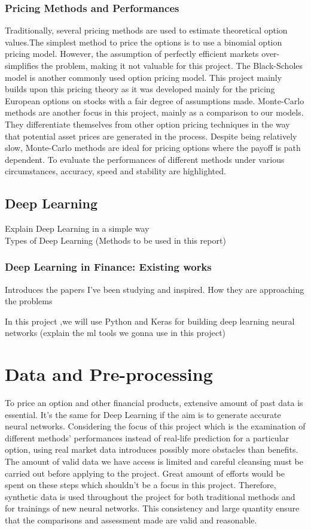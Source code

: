 \documentclass{report}
\begin{document}
\subsection{Pricing Methods and Performances}
Traditionally, several pricing methods are used to estimate theoretical option values.The simplest method to price the options is to use a binomial option pricing model. However,  the assumption of perfectly efficient markets over-simplifies the problem, making it not valuable for this project. The Black-Scholes model is another commonly used option pricing model. This project mainly builds upon this pricing theory as it was developed mainly for the pricing European options on stocks with a fair degree of assumptions made. Monte-Carlo methods are another focus in this project, mainly as a comparison to our models. They differentiate themselves from other option pricing techniques in the way that potential asset prices are generated in the process. Despite being relatively slow, Monte-Carlo methods are ideal for pricing options where the payoff is path dependent. To evaluate the performances of different methods under various circumstances, accuracy, speed and stability are highlighted. 

\section{Deep Learning}
Explain Deep Learning in a simple way\\
Types of Deep Learning (Methods to be used in this report)

\subsection{Deep Learning in Finance: Existing works}
Introduces the papers I've been studying and inspired. How they are approaching the problems

In this project ,we will use Python and Keras for building deep learning neural networks (explain the ml tools we gonna use in this project)

\chapter{Data and Pre-processing}
To price an option and other financial products, extensive amount of past data is essential. It's the same for Deep Learning if the aim is to generate accurate neural networks. Considering the focus of this project which is the examination of different methods' performances instead of real-life prediction for a particular option, using real market data introduces possibly more obstacles than benefits. The amount of valid data we have access is limited and careful cleansing must be carried out before applying to the project. Great amount of efforts would be spent on these steps which shouldn't be a focus in this project. Therefore, synthetic data is used throughout the project for both traditional methods and for trainings of new neural networks. This consistency and large quantity ensure that the comparisons and assessment made are valid and reasonable.
\end{document}
